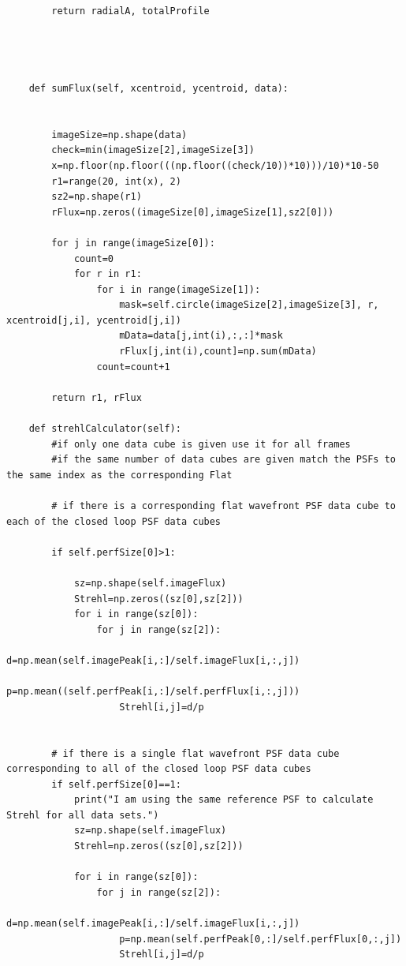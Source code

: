\begin{lstlisting}
        return radialA, totalProfile
        
  
        
    
    def sumFlux(self, xcentroid, ycentroid, data):
        
        
        imageSize=np.shape(data)
        check=min(imageSize[2],imageSize[3])
        x=np.floor(np.floor(((np.floor((check/10))*10)))/10)*10-50
        r1=range(20, int(x), 2)
        sz2=np.shape(r1)
        rFlux=np.zeros((imageSize[0],imageSize[1],sz2[0]))
        
        for j in range(imageSize[0]):
            count=0
            for r in r1:
                for i in range(imageSize[1]):
                    mask=self.circle(imageSize[2],imageSize[3], r, xcentroid[j,i], ycentroid[j,i])
                    mData=data[j,int(i),:,:]*mask
                    rFlux[j,int(i),count]=np.sum(mData)
                count=count+1 
        
        return r1, rFlux   
        
    def strehlCalculator(self):   
        #if only one data cube is given use it for all frames
        #if the same number of data cubes are given match the PSFs to the same index as the corresponding Flat
        
        # if there is a corresponding flat wavefront PSF data cube to each of the closed loop PSF data cubes
        
        if self.perfSize[0]>1:
            
            sz=np.shape(self.imageFlux)
            Strehl=np.zeros((sz[0],sz[2]))
            for i in range(sz[0]): 
                for j in range(sz[2]):  
                    d=np.mean(self.imagePeak[i,:]/self.imageFlux[i,:,j])
                    p=np.mean((self.perfPeak[i,:]/self.perfFlux[i,:,j]))
                    Strehl[i,j]=d/p
                    
        
        # if there is a single flat wavefront PSF data cube corresponding to all of the closed loop PSF data cubes
        if self.perfSize[0]==1:
            print("I am using the same reference PSF to calculate Strehl for all data sets.")
            sz=np.shape(self.imageFlux)
            Strehl=np.zeros((sz[0],sz[2]))

            for i in range(sz[0]): 
                for j in range(sz[2]):  
                    d=np.mean(self.imagePeak[i,:]/self.imageFlux[i,:,j])
                    p=np.mean(self.perfPeak[0,:]/self.perfFlux[0,:,j])
                    Strehl[i,j]=d/p
        

\end{lstlisting}
